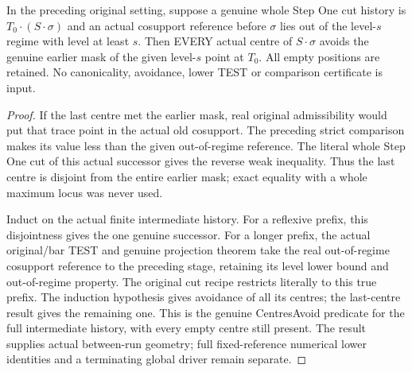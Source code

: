 \begin{theorem}
\label{hir:original-finite-stepone-cut-centres-avoid-earlier-mask}
\leanok
In the preceding original setting, suppose a genuine whole Step One cut
history is $T_0\cdot(S\cdot\sigma)$ and an actual cosupport reference
before $\sigma$ lies out of the level-$s$ regime with level at least $s$.
Then EVERY actual centre of $S\cdot\sigma$ avoids the genuine earlier mask
of the given level-$s$ point at $T_0$. All empty positions are retained.
No canonicality, avoidance, lower TEST or comparison certificate is input.
\end{theorem}
\begin{proof}
If the last centre met the earlier mask, real original admissibility would
put that trace point in the actual old cosupport. The preceding strict
comparison makes its value less than the given out-of-regime reference.
The literal whole Step One cut of this actual successor gives the reverse
weak inequality. Thus the last centre is disjoint from the entire earlier
mask; exact equality with a whole maximum locus was never used.

Induct on the actual finite intermediate history. For a reflexive prefix,
this disjointness gives the one genuine successor. For a longer prefix,
the actual original/bar TEST and genuine projection theorem take the real
out-of-regime cosupport reference to the preceding stage, retaining its
level lower bound and out-of-regime property. The original cut recipe
restricts literally to this true prefix. The induction hypothesis gives
avoidance of all its centres; the last-centre result gives the remaining
one. This is the genuine CentresAvoid predicate for the full intermediate
history, with every empty centre still present.
The result supplies actual between-run geometry; full fixed-reference
numerical lower identities and a terminating global driver remain separate.
\end{proof}
